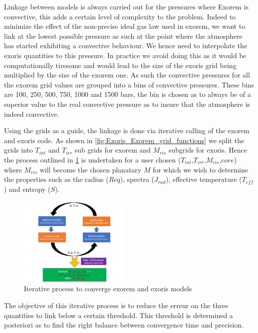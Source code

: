 Linkage between models is always carried out for the pressures where Exorem is convective, this adds a certain level of complexity to the problem. Indeed to minimize the effect of the non-precise ideal gas law used in exorem, we want to link at the lowest possible pressure as such at the point where the atmosphere has started exhibiting a convective behaviour. We hence need to interpolate the exoris quantities to this pressure. In practice we avoid doing this as it would be computationally tiresome and would lead to the size of the exoris grid being multiplied by the size of the exorem one. As such the convective pressures for all the exorem grid values are grouped into a bins of convective pressures. These bins are 100, 250, 500, 750, 1000 and 1500 bars, the bin is chosen as to always be of a superior value to the real convective pressure as to insure that the atmosphere is indeed convective. \par

Using the grids as a guide, the linkage is done via iterative calling of the exorem and exoris code. As shown in \cref{fig:Exoris_Exorem_grid_functions} we split the grids into $T_{int}$ and $T_{irr}$ sub grids for exorem and $M_{ris}$ subgrids for exoris. Hence the process outlined in \cref{fig:Iterative_process} is undertaken for a user chosen ($T_{int}$,$T_{irr}$,$M_{ris}$,$core$) where $M_{ris}$ will become the chosen planatary $M$ for which we wish to determine the properties such as the radius ($Req$), spectra ($J_{rad}$), effective temperature ($T_{eff}$) and entropy ($S$).\par

\begin{figure}
    \centering
    \includegraphics[width=0.48\textwidth]{Images/Iterative_process.png}
    \caption{Iterative process to converge exorem and exoris models}
    \label{fig:Iterative_process}
\end{figure}

The objective of this iterative process is to reduce the erreur on the three quantities to link below a certain threshold. This threshold is determined a posteriori as to find the right balance between convergence time and precision.\par

